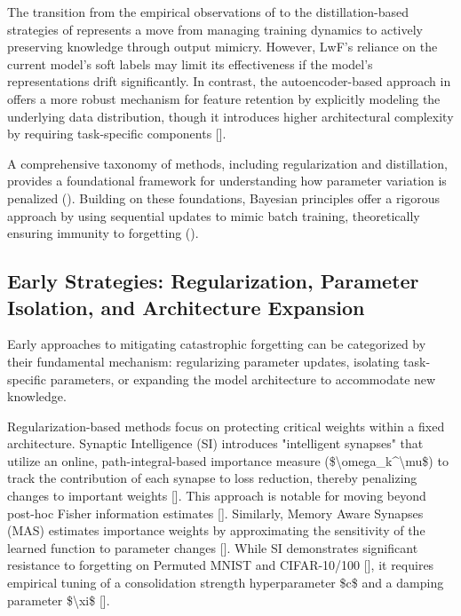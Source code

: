 \documentclass[11pt]{article}
\begin{document}
The transition from the empirical observations of \citep{1312.6211} to the distillation-based strategies of \citep{1606.09282} represents a move from managing training dynamics to actively preserving knowledge through output mimicry. However, LwF's reliance on the current model's soft labels may limit its effectiveness if the model's representations drift significantly. In contrast, the autoencoder-based approach in \citep{1704.01920} offers a more robust mechanism for feature retention by explicitly modeling the underlying data distribution, though it introduces higher architectural complexity by requiring task-specific components [\citep{1704.01920}].

A comprehensive taxonomy of methods, including regularization and distillation, provides a foundational framework for understanding how parameter variation is penalized (\citep{2302.00487}). Building on these foundations, Bayesian principles offer a rigorous approach by using sequential updates to mimic batch training, theoretically ensuring immunity to forgetting (\citep{2405.18758}).
\subsection{Early Strategies: Regularization, Parameter Isolation, and Architecture Expansion}

Early approaches to mitigating catastrophic forgetting can be categorized by their fundamental mechanism: regularizing parameter updates, isolating task-specific parameters, or expanding the model architecture to accommodate new knowledge.

Regularization-based methods focus on protecting critical weights within a fixed architecture. Synaptic Intelligence (SI) introduces "intelligent synapses" that utilize an online, path-integral-based importance measure (\$\textbackslash{}omega\_k\textasciicircum{}\textbackslash{}mu\$) to track the contribution of each synapse to loss reduction, thereby penalizing changes to important weights [\citep{1703.04200}]. This approach is notable for moving beyond post-hoc Fisher information estimates [\citep{1703.04200}]. Similarly, Memory Aware Synapses (MAS) estimates importance weights by approximating the sensitivity of the learned function to parameter changes [\citep{1711.09601}]. While SI demonstrates significant resistance to forgetting on Permuted MNIST and CIFAR-10/100 [\citep{1703.04200}], it requires empirical tuning of a consolidation strength hyperparameter \$c\$ and a damping parameter \$\textbackslash{}xi\$ [\citep{1703.04200}].
\end{document}
